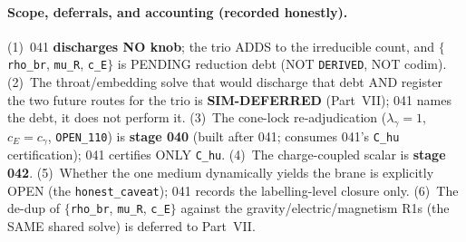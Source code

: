 \paragraph{Scope, deferrals, and accounting (recorded honestly).}
(1)~041 \textbf{discharges NO knob}; the trio ADDS to the irreducible count, and
\(\{\)\texttt{rho\_br}, \texttt{mu\_R}, \texttt{c\_E}\(\}\) is PENDING reduction
debt (NOT \texttt{DERIVED}, NOT codim). (2)~The throat/embedding solve that would
discharge that debt AND register the two future routes for the trio is
\textbf{SIM-DEFERRED} (Part~VII); 041 names the debt, it does not perform it.
(3)~The cone-lock re-adjudication (\(\lambda_\gamma=1\), \(c_E=c_\gamma\),
\texttt{OPEN\_110}) is \textbf{stage 040} (built after 041; consumes 041's
\texttt{C\_hu} certification); 041 certifies ONLY \texttt{C\_hu}. (4)~The
charge-coupled scalar is \textbf{stage 042}. (5)~Whether the one medium
dynamically yields the brane is explicitly OPEN (the \texttt{honest\_caveat});
041 records the labelling-level closure only. (6)~The de-dup of
\(\{\)\texttt{rho\_br}, \texttt{mu\_R}, \texttt{c\_E}\(\}\) against the
gravity/electric/magnetism R1s (the SAME shared solve) is deferred to Part~VII.

